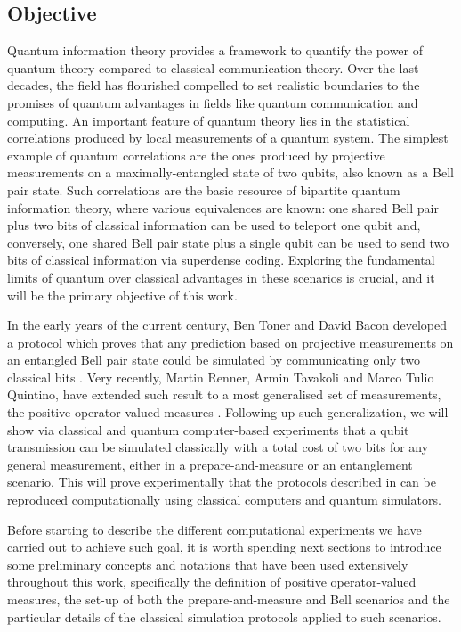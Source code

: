 \subsection{Objective}
Quantum information theory provides a framework to quantify the power of quantum theory compared to classical communication theory. Over the last decades, the field has flourished compelled to set realistic boundaries to the promises of quantum advantages in fields like quantum communication and computing. An important feature of quantum theory lies in the statistical correlations produced by local measurements of a quantum system. The simplest example of quantum correlations are the ones produced by projective measurements on a maximally-entangled state of two qubits, also known as a Bell pair state. Such correlations are the basic resource of bipartite quantum information theory, where various equivalences are known: one shared Bell pair plus two bits of classical information can be used to teleport one  qubit and, conversely, one shared Bell pair state plus a single qubit can be used to send two bits of classical information via superdense coding. Exploring the fundamental limits of quantum over classical advantages in these scenarios is crucial, and it will be the primary objective of this work.
\par
In the early years of the current century, Ben Toner and David Bacon developed a protocol which proves that any prediction based on projective measurements on an entangled Bell pair state could be simulated by communicating only two classical bits \cite{toner2003}. Very recently, Martin Renner, Armin Tavakoli and Marco Tulio Quintino, have extended such result to a most generalised set of measurements, the positive operator-valued measures \cite{renner2022}.
Following up such generalization, we will show via classical and quantum computer-based experiments that a qubit transmission can be simulated classically with a total cost of two bits for any general measurement, either in a prepare-and-measure or an entanglement scenario. This will prove experimentally that the protocols described in \cite{renner2022} can be reproduced computationally using classical computers and quantum simulators.
\par
Before starting to describe the different computational experiments we have carried out to achieve such goal, it is worth spending next sections to introduce some preliminary concepts and notations that have been used extensively throughout this work, specifically the definition of positive operator-valued measures, the set-up of both the prepare-and-measure and Bell scenarios and the particular details of the classical simulation protocols applied to such scenarios.
\par
